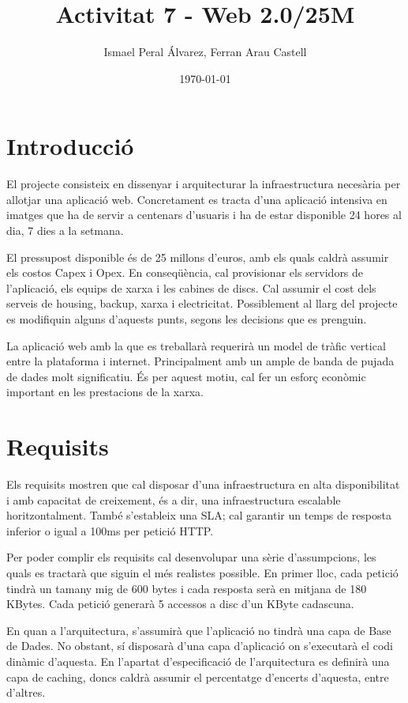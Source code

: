 \documentclass[a4paper, 11pt]{article}
\title{Activitat 7 - Web 2.0/25M}
\author{Ismael Peral Álvarez, Ferran Arau Castell}
\date{\today}
\begin{document}
\maketitle

\section{Introducció}

El projecte consisteix en dissenyar i arquitecturar la infraestructura necesària per allotjar una aplicació web. Concretament es tracta d'una aplicació intensiva en imatges que ha de servir a centenars d'usuaris i ha de estar disponible 24 hores al dia, 7 dies a la setmana.

El pressupost disponible és de 25 millons d'euros, amb els quals caldrà assumir els costos Capex i Opex. En conseqüència, cal provisionar els servidors de l'aplicació, els equips de xarxa i les cabines de discs. Cal assumir el cost dels serveis de housing, backup, xarxa i electricitat. Possiblement al llarg del projecte es modifiquin alguns d'aquests punts, segons les decisions que es prenguin.

La aplicació web amb la que es treballarà requerirà un model de tràfic vertical entre la plataforma i internet. Principalment amb un ample de banda de pujada de dades molt significatiu. És per aquest motiu, cal fer un esforç econòmic important en les prestacions de la xarxa.


\section{Requisits}

Els requisits mostren que cal disposar d'una infraestructura en alta disponibilitat i amb capacitat de creixement, és a dir, una infraestructura escalable horitzontalment. També s'estableix una SLA; cal garantir un temps de resposta inferior o igual a 100ms per petició HTTP.

Per poder complir els requisits cal desenvolupar una sèrie d'assumpcions, les quals es tractarà que siguin el més realistes possible. En primer lloc, cada petició tindrà un tamany mig de 600 bytes i cada resposta serà en mitjana de 180 KBytes. Cada petició generarà 5 accessos a disc d'un KByte cadascuna.

En quan a l'arquitectura, s'assumirà que l'aplicació no tindrà una capa de Base de Dades. No obstant, sí disposarà d'una capa d'aplicació on s'executarà el codi dinàmic d'aquesta. En l'apartat d'especificació de l'arquitectura es definirà una capa de caching, doncs caldrà assumir el percentatge d'encerts d'aquesta, entre d'altres.
\end{document}
